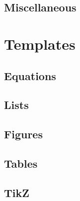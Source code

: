     \subsection{Miscellaneous}
    \label{sec:tutorial/preamble/misc}
    
    

\newpage
\section{Templates}
\label{sec:tutorial/templates}

    \subsection{Equations}
    \label{sec:tutorial/templates/math}
    
    
    \newpage
    \subsection{Lists}
    \label{sec:tutorial/templates/list}
    

    \subsection{Figures}
    \label{sec:tutorial/templates/fig}
    
    
    \subsection{Tables}
    \label{sec:tutorial/templates/table}
    
        
    \subsection{TikZ}
    \label{sec:tutorial/templates/tikz}
    
    
    \newpage
    \subsection{}
    \label{sec:tutorial/templates/bib}
    
    
